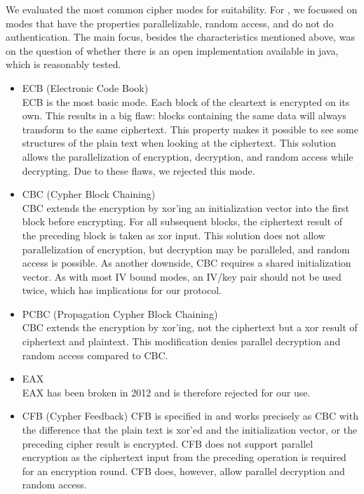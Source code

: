 We evaluated the most common cipher modes for suitability. For \MessageVortex, we focussed on modes that have the properties parallelizable, random access, and do not do authentication. The main focus, besides the characteristics mentioned above, was on the question of whether there is an open implementation available in java, which is reasonably tested.

\begin{itemize}
	\item ECB (Electronic Code Book)\\
	ECB is the most basic mode. Each block of the cleartext is encrypted on its own. This results in a big flaw: blocks containing the same data will always transform to the same ciphertext. This property makes it possible to see some structures of the plain text when looking at the ciphertext. This solution allows the parallelization of encryption, decryption, and random access while decrypting. Due to these flaws, we rejected this mode.
	\item CBC (Cypher Block Chaining)\\  
	CBC extends the encryption by xor'ing an initialization vector into the first block before encrypting. For all subsequent blocks, the ciphertext result of the preceding block is taken as xor input. This solution does not allow parallelization of encryption, but decryption may be paralleled, and random access is possible. As another downside, CBC requires a shared initialization vector. As with most IV bound modes, an IV/key pair should not be used twice, which has implications for our protocol.
	\item PCBC (Propagation Cypher Block Chaining)\\
	CBC extends the encryption by xor'ing, not the ciphertext but a xor result of ciphertext and plaintext. This modification denies parallel decryption and random access compared to CBC.
	\item EAX\\      
	EAX has been broken in 2012\cite{minematsu2013attacks} and is therefore rejected for our use.
	\item CFB (Cypher Feedback)
	CFB is specified in \cite{dworkin2001recommendation} and works precisely as CBC with the difference that the plain text is xor'ed and the initialization vector, or the preceding cipher result is encrypted. CFB does not support parallel encryption as the ciphertext input from the preceding operation is required for an encryption round. CFB does, however, allow parallel decryption and random access.

\end{itemize}
